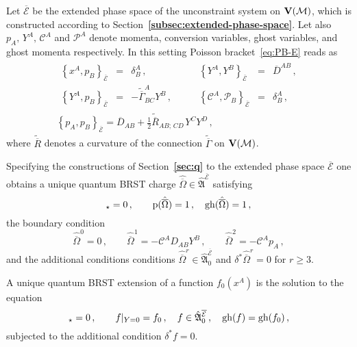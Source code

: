 \documentclass[a4paper,11pt]{amsart}
\numberwithin{thm}{section} %
\numberwithin{equation}{section} %
\numberwithin{figure}{section} %
\newcommand{\bref}[1]{{\bf \ref{#1}}}
\newcommand{\qcommut}[2]{[#1,#2]_\star}
\newcommand{\pb}[2]{\left\{{}#1{},{}#2{}\right\}}
\newcommand{\gh}[1]{{\rm gh}(#1)}
\newcommand{\p}[1]{{\rm p}(#1)}
\renewcommand{\:}{{\rm\, :\,}}
\def\bar{\overline}
\def\half{{\frac{1}{2}}}
\def\cP{{\mathcal P}}
\def\cc{{\mathcal C}}
\def\manM{{\mathcal M}}
\def\qA{{\hat{\mathfrak A}}}
\def\E{{ \mathcal E}}
\def\V{{\bf V}}
\def\con{{\bar\Gamma}}
\def\aD{{\bar D}}
\def\conn{{\tilde\con}}
\begin{document}
Let $\bar\E$ be the extended phase space of the unconstraint system
on $\V(\manM)$, which is  constructed according to
Section~\bref{subsec:extended-phase-space}. Let also 
$p_A,\,Y^A,\,\cc^A$ and $\cP^A$ denote momenta, conversion variables, ghost
variables, and ghost momenta respectively.
In this setting Poisson bracket~\eqref{eq:PB-E} reads as
\begin{equation}
\begin{gathered}
  \label{eq:PB-E-2}
 \begin{array}{rclrcl}
    \pb{x^A}{p_B}_{\bar\E}&=&\delta^A_B\,, \qquad&
    \pb{Y^A}{Y^B}_{\bar\E}&=&\aD^{AB}\,,\\[5pt]
    \pb{Y^A}{p_B}_{\bar\E}&=&-\conn^A_{BC}Y^B\,,\qquad&
    \pb{\cc^A}{\cP_B}_{\bar\E}&=&\delta^A_B\,, 
  \end{array}\\[5pt]
  \pb{p_A}{p_B}_{\bar\E}=
\aD_{AB}+{\half}{\tilde {\bar R}}_{AB;\,CD\,}Y^C Y^D\,,
\end{gathered}
\end{equation}
where $\tilde {\bar R}$ denotes a curvature of the connection $\conn$
on $\V(\manM)$.

Specifying the constructions of Section~\bref{sec:q}
to the extended phase space $\bar \E$ one obtains
a unique quantum BRST charge $\hat{\bar\Omega}\in\qA^{\bar\E}$
satisfying
\begin{equation}
  \qcommut{\hat{\bar\Omega}}{\hat{\bar\Omega}}=0\,, \qquad
\p{\hat{\bar\Omega}}=1\,,\quad \gh{\hat{\bar\Omega}}=1\,,
\end{equation}
the boundary condition
\begin{equation}
\hat{\bar\Omega}^0=0\,,\qquad
\hat{\bar\Omega}^1=-\cc^A D_{AB} Y^B\,,\qquad
\hat{\bar\Omega}^2=-\cc^A p_A\,,
\end{equation}
and the additional conditions conditions
${\hat{\bar\Omega}}^r \in \qA^{\bar\E}_0$
and $\delta^* \hat{\bar\Omega}^r=0$ for $r\geq 3$.

A unique quantum BRST extension of a function $f_0(x^A)$ is the
solution to the equation
\begin{equation}
  \qcommut{{\hat{\bar\Omega}}}{f}=0\,, \qquad f|_{Y=0}=f_0\,,
 \quad f\in\qA^{\bar\E}_0\,,\quad \gh{f}=\gh{f_0}\,,
\end{equation}
subjected to the additional condition $\delta^* f=0$.
\end{document}
